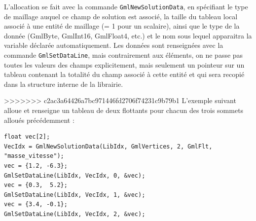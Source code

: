 \documentclass[a4paper,12pt]{article}
\begin{document}
L'allocation se fait avec la commande {\tt GmlNewSolutionData}, en spécifiant le type de maillage auquel ce champ de solution est associé, la taille du tableau local associé à une entité de maillage (= 1 pour un scalaire), ainsi que le type de la donnée (GmlByte, GmlInt16, GmlFloat4, etc.) et le nom sous lequel apparaitra la variable déclarée automatiquement.
Les données sont renseignées avec la commande {\tt GmlSetDataLine}, mais contrairement aux éléments, on ne passe pas toutes les valeurs des champs explicitement, mais seulement un pointeur sur un tableau contenant la totalité du champ associé à cette entité et qui sera recopié dans la structure interne de la librairie.

>>>>>>> c2ac3a64426a7bc971446fd2706f74231c9b79b1
L'exemple suivant alloue et renseigne un tableau de deux flottants pour chacun des trois sommets alloués précédemment :

\begin{tt}
\begin{verbatim}
float vec[2];
VecIdx = GmlNewSolutionData(LibIdx, GmlVertices, 2, GmlFlt, "masse_vitesse");
vec = {1.2, -6.3};
GmlSetDataLine(LibIdx, VecIdx, 0, &vec);
vec = {0.3,  5.2};
GmlSetDataLine(LibIdx, VecIdx, 1, &vec);
vec = {3.4, -0.1};
GmlSetDataLine(LibIdx, VecIdx, 2, &vec);
\end{verbatim}
\end{tt}
\normalfont
\end{document}
